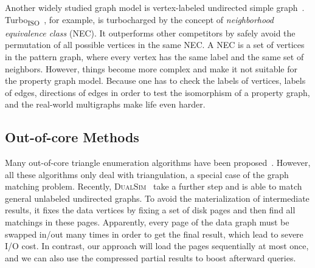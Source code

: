 Another widely studied graph model is vertex-labeled undirected simple graph~\cite{DBLP:journals/pvldb/ShangZLY08,DBLP:journals/pvldb/SunWWSL12,DBLP:conf/sigmod/HanLL13,DBLP:conf/cloud/SerafiniMS17,DBLP:conf/sigmod/DiasTGM019}.
Turbo\textsubscript{ISO}~\cite{DBLP:conf/sigmod/HanLL13}, for example, is turbocharged by the concept of \emph{neighborhood equivalence class} (NEC).
It outperforms other competitors by safely avoid the permutation of all possible vertices in the same NEC\@.
A NEC is a set of vertices in the pattern graph, where every vertex has the same label and the same set of neighbors.
However, things become more complex and make it not suitable for the property graph model.
Because one has to check the labels of vertices, labels of edges, directions of edges in order to test the isomorphism of a property graph, and the real-world multigraphs make life even harder.
\subsection*{Out-of-core Methods}
Many out-of-core triangle enumeration algorithms have been proposed~\cite{DBLP:conf/kdd/ChuC11,DBLP:conf/osdi/KyrolaBG12,DBLP:conf/sigmod/HuTC13,DBLP:conf/sigmod/KimHLPY14}.
However, all these algorithms only deal with triangulation, a special case of the graph matching problem.
Recently, \textsc{DualSim}~\cite{DBLP:conf/sigmod/KimLBHLKJ16} take a further step and is able to match general unlabeled undirected graphs.
To avoid the materialization of intermediate results,
it fixes the data vertices by fixing a set of disk pages and then find all matchings in these pages.
Apparently, every page of the data graph must be swapped in/out many times in order to get the final result,
which lead to severe I/O cost.
In contrast, our approach will load the pages sequentially at most once,
and we can also use the compressed partial results to boost afterward queries.
